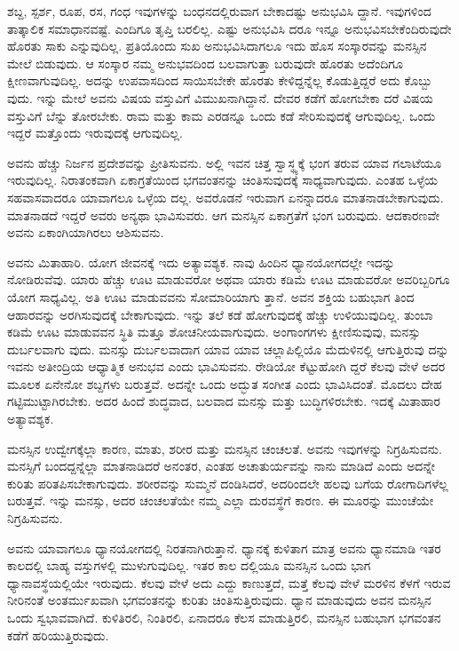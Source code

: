 ಶಬ್ದ, ಸ್ಪರ್ಶ, ರೂಪ, ರಸ, ಗಂಧ ಇವುಗಳನ್ನು ಬಂಧನದಲ್ಲಿರುವಾಗ ಬೇಕಾದಷ್ಟು ಅನುಭವಿಸಿ ದ್ದಾನೆ. ಇವುಗಳಿಂದ ತಾತ್ಕಾಲಿಕ ಸಮಾಧಾನವಷ್ಟೆ. ಎಂದಿಗೂ ತೃಪ್ತಿ ಬರಲಿಲ್ಲ. ಎಷ್ಟು ಅನುಭವಿಸಿ ದರೂ ಇನ್ನೂ ಅನುಭವಿಸಬೇಕೆಂದಿರುವುದೇ ಹೊರತು ಸಾಕು ಎನ್ನುವುದಿಲ್ಲ. ಪ್ರತಿಯೊಂದು ಸುಖ ಅನುಭವಿಸಿದಾಗಲೂ ಇದು ಹೊಸ ಸಂಸ್ಕಾರವನ್ನು ಮನಸ್ಸಿನ ಮೇಲೆ ಬಿಡುವುದು. ಆ ಸಂಸ್ಕಾರ ನಮ್ಮ ಅನುಭವದಿಂದ ಬಲವಾಗುತ್ತಾ ಬರುವುದೇ ಹೊರತು ಅದೆಂದಿಗೂ ಕ್ಷೀಣವಾಗುವುದಿಲ್ಲ. ಅದನ್ನು ಉಪವಾಸದಿಂದ ಸಾಯಿಸಬೇಕೇ ಹೊರತು ಕೇಳಿದ್ದನ್ನೆಲ್ಲ ಕೊಡುತ್ತಿದ್ದರೆ ಅದು ಕೊಬ್ಬು ವುದು. ಇನ್ನು ಮೇಲೆ ಅವನು ವಿಷಯ ವಸ್ತುವಿಗೆ ವಿಮುಖನಾಗಿದ್ದಾನೆ. ದೇವರ ಕಡೆಗೆ ಹೋಗಬೇಕಾ ದರೆ ವಿಷಯ ವಸ್ತುವಿಗೆ ಬೆನ್ನು ತೋರಬೇಕು. ರಾಮ ಮತ್ತು ಕಾಮ ಎರಡನ್ನೂ ಒಂದು ಕಡೆ ಸೇರಿಸುವುದಕ್ಕೆ ಆಗುವುದಿಲ್ಲ. ಒಂದು ಇದ್ದರೆ ಮತ್ತೊಂದು ಇರುವುದಕ್ಕೆ ಆಗುವುದಿಲ್ಲ.

ಅವನು ಹೆಚ್ಚು ನಿರ್ಜನ ಪ್ರದೇಶವನ್ನು ಪ್ರೀತಿಸುವನು. ಅಲ್ಲಿ ಇವನ ಚಿತ್ತ ಸ್ವಾಸ್ಥ್ಯಕ್ಕೆ ಭಂಗ ತರುವ ಯಾವ ಗಲಾಟೆಯೂ ಇರುವುದಿಲ್ಲ. ನಿರಾತಂಕವಾಗಿ ಏಕಾಗ್ರತೆಯಿಂದ ಭಗವಂತನನ್ನು ಚಿಂತಿಸುವುದಕ್ಕೆ ಸಾಧ್ಯವಾಗುವುದು. ಎಂತಹ ಒಳ್ಳೆಯ ಸಹವಾಸವಾದರೂ ಯಾವಾಗಲೂ ಒಳ್ಳೆಯ ದಲ್ಲ. ಅವರೊಡನೆ ಇರುವಾಗ ಏನನ್ನಾದರೂ ಮಾತನಾಡಬೇಕಾಗುವುದು. ಮಾತನಾಡದೆ ಇದ್ದರೆ ಅವರು ಅನ್ಯಥಾ ಭಾವಿಸುವರು. ಆಗ ಮನಸ್ಸಿನ ಏಕಾಗ್ರತೆಗೆ ಭಂಗ ಬರುವುದು. ಆದಕಾರಣವೇ ಅವನು ಏಕಾಂಗಿಯಾಗಿರಲು ಆಶಿಸುವನು.

ಅವನು ಮಿತಾಹಾರಿ. ಯೋಗ ಜೀವನಕ್ಕೆ ಇದು ಅತ್ಯಾವಶ್ಯಕ. ನಾವು ಹಿಂದಿನ ಧ್ಯಾನಯೋಗದಲ್ಲೇ ಇದನ್ನು ನೋಡಿರುವೆವು. ಯಾರು ಹೆಚ್ಚು ಊಟ ಮಾಡುವರೋ ಅಥವಾ ಯಾರು ಕಡಿಮೆ ಊಟ ಮಾಡುವರೋ ಅವರಿಬ್ಬರಿಗೂ ಯೋಗ ಸಾಧ್ಯವಿಲ್ಲ. ಅತಿ ಊಟ ಮಾಡುವವನು ಸೋಮಾರಿಯಾಗು ತ್ತಾನೆ. ಅವನ ಶಕ್ತಿಯ ಬಹುಭಾಗ ತಿಂದ ಆಹಾರವನ್ನು ಅರಗಿಸುವುದಕ್ಕೆ ಬೇಕಾಗುವುದು. ಇನ್ನು ತಲೆ ಕಡೆ ಹೋಗುವುದಕ್ಕೆ ಹೆಚ್ಚು ಉಳಿಯುವುದಿಲ್ಲ. ತುಂಬಾ ಕಡಿಮೆ ಊಟ ಮಾಡುವವನ ಸ್ಥಿತಿ ಮತ್ತೂ ಶೋಚನೀಯವಾಗುವುದು. ಅಂಗಾಂಗಗಳು ಕ್ಷೀಣಿಸುವುವು, ಮನಸ್ಸು ದುರ್ಬಲವಾಗು ವುದು. ಮನಸ್ಸು ದುರ್ಬಲವಾದಾಗ ಯಾವ ಯಾವ ಚಲ್ಲಾಪಿಲ್ಲಿಯೊ ಮೆದುಳಿನಲ್ಲಿ ಆಗುತ್ತಿರುವು ದನ್ನು ಇವನು ಅತೀಂದ್ರಿಯ ಆಧ್ಯಾತ್ಮಿಕ ಅನುಭವ ಎಂದು ಭಾವಿಸುವನು. ರೇಡಿಯೋ ಕೆಟ್ಟುಹೋಗಿ ದ್ದರೆ ಕೆಲವು ವೇಳೆ ಅದರ ಮೂಲಕ ಏನೇನೋ ಶಬ್ದಗಳು ಬರುತ್ತವೆ. ಅದನ್ನೇ ಒಂದು ಅದ್ಭುತ ಸಂಗೀತ ಎಂದು ಭಾವಿಸಿದಂತೆ. ಮೊದಲು ದೇಹ ಗಟ್ಟಿಮುಟ್ಟಾಗಿರಬೇಕು. ಅದರ ಹಿಂದೆ ಶುದ್ಧವಾದ, ಬಲವಾದ ಮನಸ್ಸು ಮತ್ತು ಬುದ್ಧಿಗಳಿರಬೇಕು. ಇದಕ್ಕೆ ಮಿತಾಹಾರ ಅತ್ಯಾವಶ್ಯಕ.

ಮನಸ್ಸಿನ ಉದ್ವೇಗಕ್ಕೆಲ್ಲಾ ಕಾರಣ, ಮಾತು, ಶರೀರ ಮತ್ತು ಮನಸ್ಸಿನ ಚಂಚಲತೆ. ಅವನು ಇವುಗಳನ್ನು ನಿಗ್ರಹಿಸುವನು. ಮನಸ್ಸಿಗೆ ಬಂದದ್ದನ್ನೆಲ್ಲಾ ಮಾತನಾಡಿದರೆ ಅನಂತರ, ಎಂತಹ ಅಚಾತುರ್ಯವನ್ನು ನಾನು ಮಾಡಿದೆ ಎಂದು ಅದನ್ನೇ ಕುರಿತು ಪರಿತಪಿಸಬೇಕಾಗುವುದು. ಶರೀರವನ್ನು ಸುಮ್ಮನೆ ದಂಡಿಸಿದರೆ, ಅದರಿಂದಲೇ ಹಲವು ಬಗೆಯ ರೋಗಾದಿಗಳೆಲ್ಲ ಬರುತ್ತವೆ. ಇನ್ನು ಮನಸ್ಸು, ಅದರ ಚಂಚಲತೆಯೇ ನಮ್ಮ ಎಲ್ಲಾ ದುರವಸ್ಥೆಗೆ ಕಾರಣ. ಈ ಮೂರನ್ನು ಮುಂಚೆಯೇ ನಿಗ್ರಹಿಸುವನು.

ಅವನು ಯಾವಾಗಲೂ ಧ್ಯಾನಯೋಗದಲ್ಲಿ ನಿರತನಾಗಿರುತ್ತಾನೆ. ಧ್ಯಾನಕ್ಕೆ ಕುಳಿತಾಗ ಮಾತ್ರ ಅವನು ಧ್ಯಾನಮಾಡಿ ಇತರ ಕಾಲದಲ್ಲಿ ಬಾಹ್ಯ ವಸ್ತುಗಳಲ್ಲಿ ಮುಳುಗುವುದಿಲ್ಲ. ಇತರ ಕಾಲ ದಲ್ಲಿಯೂ ಮನಸ್ಸಿನ ಒಂದು ಭಾಗ ಧ್ಯಾನಾವಸ್ಥೆಯಲ್ಲಿಯೇ ಇರುವುದು. ಕೆಲವು ವೇಳೆ ಅದು ಎದ್ದು ಕಾಣುತ್ತದೆ, ಮತ್ತೆ ಕೆಲವು ವೇಳೆ ಮರಳಿನ ಕೆಳಗೆ ಇರುವ ನೀರಿನಂತೆ ಅಂತರ್ಮುಖವಾಗಿ ಭಗವಂತನನ್ನು ಕುರಿತು ಚಿಂತಿಸುತ್ತಿರುವುದು. ಧ್ಯಾನ ಮಾಡುವುದು ಅವನ ಮನಸ್ಸಿನ ಒಂದು ಸ್ವಭಾವವಾಗಿದೆ. ಕುಳಿತಿರಲಿ, ನಿಂತಿರಲಿ, ಏನಾದರೂ ಕೆಲಸ ಮಾಡುತ್ತಿರಲಿ, ಮನಸ್ಸಿನ ಬಹುಭಾಗ ಭಗವಂತನ ಕಡೆಗೆ ಹರಿಯುತ್ತಿರುವುದು.

